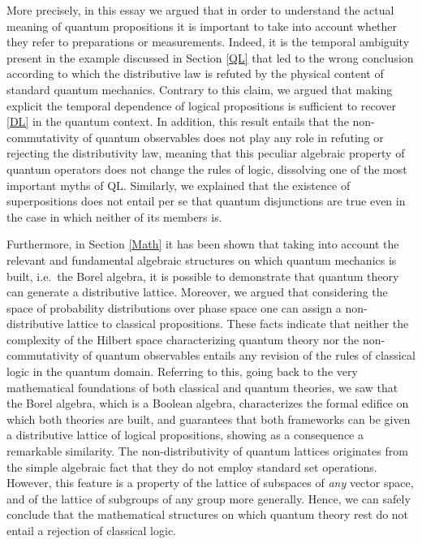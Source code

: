 \documentclass[11pt, executivepaper]{article}
\begin{document}
More precisely, in this essay we argued that in order to understand the actual meaning of quantum propositions it is important to take into account whether they refer to preparations or measurements. Indeed, it is the temporal ambiguity present in the example discussed in Section \ref{QL} that led to the wrong conclusion according to which the distributive law is refuted by the physical content of standard quantum mechanics. Contrary to this claim, we argued that making explicit the temporal dependence of logical propositions is sufficient to recover \eqref{DL} in the quantum context. In addition, this result entails that the non-commutativity of quantum observables does not play any role in refuting or rejecting the distributivity law, meaning that this peculiar algebraic property of quantum operators does not change the rules of logic, dissolving one of the most important myths of QL. Similarly, we explained that the existence of superpositions does not entail per se that quantum disjunctions are true even in the case in which neither of its members is. 

Furthermore, in Section \ref{Math} it has been shown that taking into account the relevant and fundamental algebraic structures on which quantum mechanics is built, i.e.\ the Borel algebra, it is possible to demonstrate that quantum theory can generate a distributive lattice. Moreover, we argued that considering the space of probability distributions over phase space one can assign a non-distributive lattice to classical propositions. These facts indicate that neither the complexity of the Hilbert space characterizing quantum theory nor the non-commutativity of quantum observables entails any revision of the rules of classical logic in the quantum domain. Referring to this, going back to the very mathematical foundations of both classical and quantum theories, we saw that the Borel algebra, which is a Boolean algebra, characterizes the formal edifice on which both theories are built, and guarantees that both frameworks can be given a distributive lattice of logical propositions, showing as a consequence a remarkable similarity. The non-distributivity of quantum lattices originates from the simple algebraic fact that they do not employ standard set operations. However, this feature is a property of the lattice of subspaces of \emph{any} vector space, and of the lattice of subgroups of any group more generally. Hence, we can safely conclude that the mathematical structures on which quantum theory rest do not entail a rejection of classical logic. 
\end{document}
